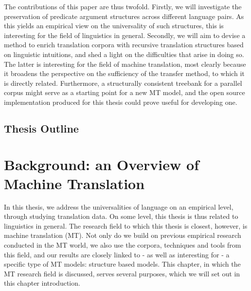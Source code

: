 \documentclass{report}
\theoremstyle{break}
\begin{document}
The contributions of this paper are thus twofold. Firstly, we will investigate the preservation of predicate argument structures across different language pairs. As this yields an empirical view on the universality of such structures, this is interesting for the field of linguistics in general. Secondly, we will aim to devise a method to enrich translation corpora with recursive translation structures based on linguistic intuitions, and shed a light on the difficulties that arise in doing so. The latter is interesting for the field of machine translation, most clearly because it broadens the perspective on the sufficiency of the transfer method, to which it is directly related. Furthermore, a structurally consistent treebank for a parallel corpus might serve as a starting point for a new MT model, and the open source implementation produced for this thesis could prove useful for developing one.


\section*{Thesis Outline}





\chapter{Background: an Overview of Machine Translation}

In this thesis, we address the universalities of language on an empirical level, through studying translation data. On some level, this thesis is thus related to linguistics in general. The research field to which this thesis is closest, however, is machine translation (MT). Not only do we build on previous empirical research conducted in the MT world, we also use the corpora, techniques and tools from this field, and our results are closely linked to - as well as interesting for - a specific type of MT models: structure based models. This chapter, in which the MT research field is discussed, serves several purposes, which we will set out in this chapter introduction.
\end{document}
